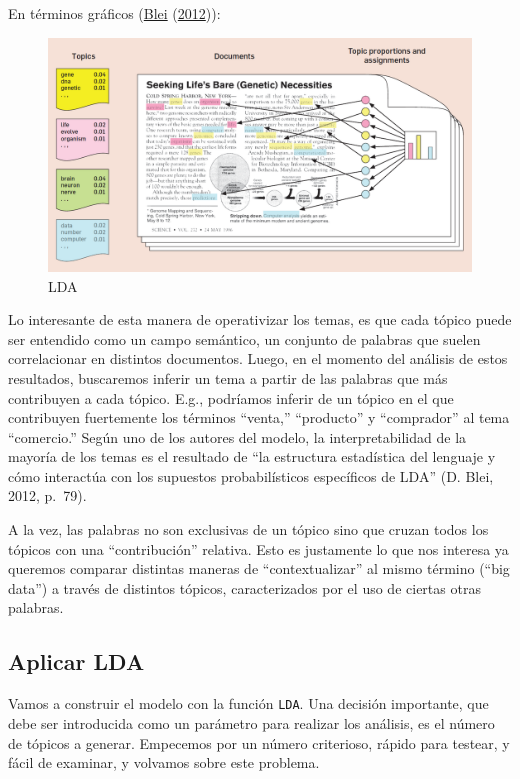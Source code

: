 \documentclass[
]{book}
\begin{document}
En términos gráficos (\protect\hyperlink{ref-Blei2012}{Blei} (\protect\hyperlink{ref-Blei2012}{2012})):

\begin{figure}
\centering
\includegraphics{images/blei2012.png}
\caption{LDA}
\end{figure}

Lo interesante de esta manera de operativizar los temas, es que cada tópico puede ser entendido como un campo semántico, un conjunto de palabras que suelen correlacionar en distintos documentos. Luego, en el momento del análisis de estos resultados, buscaremos inferir un tema a partir de las palabras que más contribuyen a cada tópico. E.g., podríamos inferir de un tópico en el que contribuyen fuertemente los términos ``venta,'' ``producto'' y ``comprador'' al tema ``comercio.''
Según uno de los autores del modelo, la interpretabilidad de la mayoría de los temas es el resultado de ``la estructura estadística del lenguaje y cómo interactúa con los supuestos probabilísticos específicos de LDA'' (D. Blei, 2012, p.~79).

A la vez, las palabras no son exclusivas de un tópico sino que cruzan todos los tópicos con una ``contribución'' relativa. Esto es justamente lo que nos interesa ya queremos comparar distintas maneras de ``contextualizar'' al mismo término (``big data'') a través de distintos tópicos, caracterizados por el uso de ciertas otras palabras.

\hypertarget{aplicar-lda}{%
\subsection{Aplicar LDA}\label{aplicar-lda}}

Vamos a construir el modelo con la función \texttt{LDA}. Una decisión importante, que debe ser introducida como un parámetro para realizar los análisis, es el número de tópicos a generar. Empecemos por un número criterioso, rápido para testear, y fácil de examinar, y volvamos sobre este problema.
\end{document}
